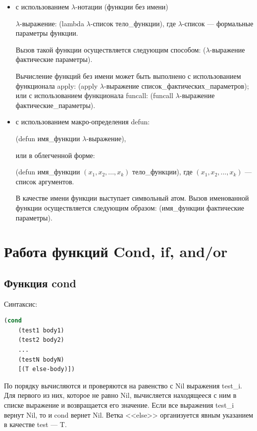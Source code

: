 \documentclass[12pt]{report}
\begin{document}
\begin{itemize}
    \item с использованием $\lambda$-нотации (функции без имени)
	
            $\lambda$-выражение: (lambda $\lambda$-список тело\_функции), 
            где $\lambda$-список --- формальные параметры функции.
	
            Вызов такой функции осуществляется следующим способом: ($\lambda$-выражение фактические параметры).

            Вычисление функций без имени может быть выполнено с использованием функционала apply: (apply $\lambda$-выражение список\_фактических\_параметров); или с использованием функционала funcall: (funcall $\lambda$-выражение фактические\_параметры).
	
    \item с использованием макро-определения defun: 
	
	(defun имя\_функции $\lambda$-выражение), 
	
	или  в облегченной форме:
	
	(defun имя\_функции $(x_1, x_2, ..., x_k)$ тело\_функции), 
	где $(x_1, x_2, ..., x_k)$ --- список аргументов.
	
	В качестве имени функции выступает символьный атом. 
	Вызов именованной функции осуществляется следующим образом: (имя\_функции фактические параметры).
\end{itemize} 


\section{Работа функций Cond, if, and/or}

\subsection{Функция cond}

Синтаксис:

\begin{lstlisting}[language=Lisp]
(cond
    (test1 body1)
    (test2 body2)
    ...
    (testN bodyN)
    [(T else-body)])
\end{lstlisting}

По порядку вычисляются и проверяются на равенство с Nil выражения test\_i. Для
первого из них, которое не равно Nil, вычисляется находящееся с ним
в списке выражение и возвращается его значение. Если все выражения test\_i вернут Nil, то и cond вернет Nil. Ветка <<else>> организуется явным указанием в
качестве test --- T.
\end{document}
